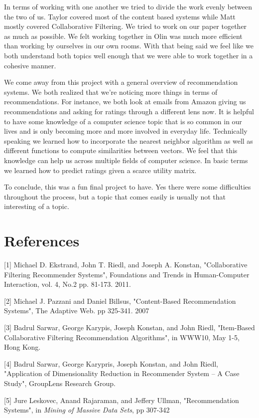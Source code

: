 \documentclass[11pt,reqno]{amsart}
\theoremstyle{definition}
\numberwithin{equation}{subsection}
\begin{document}
In terms of working with one another we tried to divide the work evenly between the two of us.  Taylor covered most of the content based systems while Matt mostly covered Collaborative Filtering.  We tried to work on our paper together as much as possible.  We felt working together in Olin was much more efficient than working by ourselves in our own rooms. With that being said we feel like we both understand both topics well enough that we were able to work together in a cohesive manner. 

We come away from this project with a general overview of recommendation systems.  We both realized that we're noticing more things in terms of recommendations.  For instance, we both look at emails from Amazon giving us recommendations and asking for ratings through a different lens now. It is helpful to have some knowledge of a computer science topic that is so common in our lives and is only becoming more and more involved in everyday life. Technically speaking we learned how to incorporate the nearest neighbor algorithm as well as different functions to compute similarities between vectors.  We feel that this knowledge can help us across multiple fields of computer science. In basic terms we learned how to predict ratings given a scarce utility matrix.


To conclude, this was a fun final project to have.  Yes there were some difficulties throughout the process, but a topic that comes easily is usually not that interesting of a topic. 




\section{References}

[1] Michael D. Ekstrand, John T. Riedl, and Joseph A. Konstan, "Collaborative Filtering Recommender Systems", Foundations and Trends in Human-Computer Interaction, vol. 4, No.2 pp. 81-173. 2011.

[2] Michael J. Pazzani and Daniel Billsus, "Content-Based Recommendation Systems", The Adaptive Web. pp 325-341. 2007

[3] Badrul Sarwar, George Karypis, Joseph Konstan, and John Riedl, "Item-Based Collaborative Filtering Recommendation Algorithms", in WWW10, May 1-5, Hong Kong. 

[4] Badrul Sarwar, George Karypris, Joseph Konstan, and John Riedl, "Application of Dimensionality Reduction in Recommender System --  A Case Study", GroupLens Research Group.

[5] Jure Leskovec, Anand Rajaraman, and Jeffery Ullman, "Recommendation Systems", in \textit{Mining of Massive Data Sets}, pp 307-342
\end{document}
